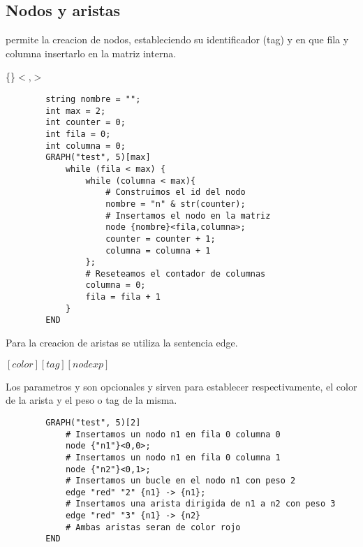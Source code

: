 \documentclass{article}
\begin{document}
    \subsection{Nodos y aristas}
     permite la creacion de nodos, estableciendo su identificador (tag) y en que fila y columna insertarlo 
    en la matriz interna.
    \begin{center}
        \{\}$<$,$>$
    \end{center}
    \begin{lstlisting}
        string nombre = "";
        int max = 2;
        int counter = 0;
        int fila = 0;
        int columna = 0;
        GRAPH("test", 5)[max]
            while (fila < max) {
                while (columna < max){
                    # Construimos el id del nodo
                    nombre = "n" & str(counter);
                    # Insertamos el nodo en la matriz
                    node {nombre}<fila,columna>;
                    counter = counter + 1;
                    columna = columna + 1
                };
                # Reseteamos el contador de columnas
                columna = 0;
                fila = fila + 1
            }
        END
    \end{lstlisting}
    Para la creacion de aristas se utiliza la sentencia edge. 
    \begin{center}
         $\left[color\right] \left[tag\right]  \left[nodexp\right]$
    \end{center}
    Los parametros  y  son opcionales y sirven para establecer respectivamente, 
    el color de la arista y el peso o tag de la misma.
    \begin{lstlisting}
        GRAPH("test", 5)[2]
            # Insertamos un nodo n1 en fila 0 columna 0
            node {"n1"}<0,0>;
            # Insertamos un nodo n1 en fila 0 columna 1
            node {"n2"}<0,1>;
            # Insertamos un bucle en el nodo n1 con peso 2
            edge "red" "2" {n1} -> {n1};
            # Insertamos una arista dirigida de n1 a n2 con peso 3
            edge "red" "3" {n1} -> {n2}
            # Ambas aristas seran de color rojo
        END
    \end{lstlisting}

    \newpage
\end{document}
